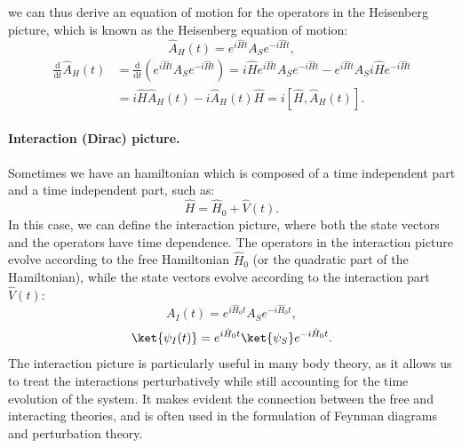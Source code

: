 we can thus derive an equation of motion for the operators in the Heisenberg picture, which is known as the Heisenberg equation of motion:
\[
    \hat{A}_H(t) = e^{i \hat{H}t} A_S e^{-i \hat{H}t},
\]
\[
    \begin{aligned}
        \frac{\mathrm{d}}{\mathrm{d} t} \hat{A}_H(t) & = \frac{\mathrm{d}}{\mathrm{d} t} \left( e^{i \hat{H}t} A_S e^{-i \hat{H}t} \right)  = i \hat{H} e^{i \hat{H}t} A_S e^{-i \hat{H}t} - e^{i \hat{H}t} A_S i \hat{H} e^{-i \hat{H}t} \\
                                                     & = i \hat{H} \hat{A}_H(t) - i \hat{A}_H(t) \hat{H} = i [\hat{H}, \hat{A}_H(t)].
    \end{aligned}
\]

\paragraph{Interaction (Dirac) picture.}
Sometimes we have an hamiltonian which is composed of a time independent part and a time independent part, such as:
\[
    \hat{H} = \hat{H}_0 + \hat{V}(t).
\]
In this case, we can define the interaction picture, where both the state vectors and the operators have time dependence. The operators in the interaction picture evolve according to the free Hamiltonian \(\hat{H}_0\) (or the quadratic part of the Hamiltonian), while the state vectors evolve according to the interaction part \(\hat{V}(t)\):
\[
    A_I(t) = e^{i \hat{H}_0 t} A_S e^{-i \hat{H}_0 t},
\]
\[
    \ket{\psi_I(t)} = e^{i \hat{H}_0 t} \ket{\psi_S} e^{-i \hat{H}_0 t}.
\]
The interaction picture is particularly useful in many body theory, as it allows us to treat the interactions perturbatively while still accounting for the time evolution of the system. It makes evident the connection between the free and interacting theories, and is often used in the formulation of Feynman diagrams and perturbation theory.

